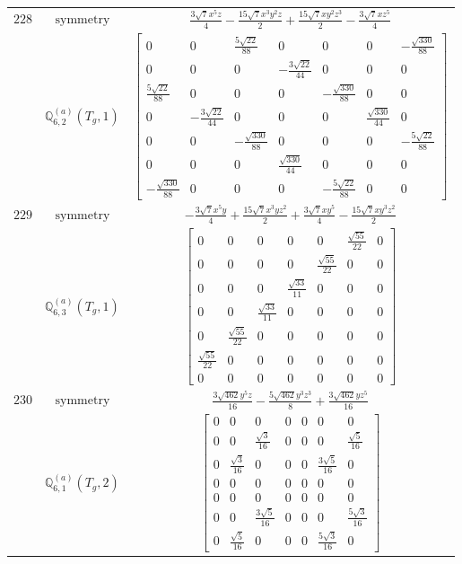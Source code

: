 \documentclass[fleqn,8pt,landscape]{jsarticle}
\begin{document}
\begin{longtable}{ccc}
$ 228 $ & $ \text{symmetry} $ & $ \frac{3 \sqrt{7} x^{5} z}{4} - \frac{15 \sqrt{7} x^{3} y^{2} z}{2} + \frac{15 \sqrt{7} x y^{2} z^{3}}{2} - \frac{3 \sqrt{7} x z^{5}}{4} $ \\
$  $ & $ \mathbb{Q}_{6,2}^{(a)}(T_{g},1) $ & $ \begin{bmatrix} 0 & 0 & \frac{5 \sqrt{22}}{88} & 0 & 0 & 0 & - \frac{\sqrt{330}}{88} \\ 0 & 0 & 0 & - \frac{3 \sqrt{22}}{44} & 0 & 0 & 0 \\ \frac{5 \sqrt{22}}{88} & 0 & 0 & 0 & - \frac{\sqrt{330}}{88} & 0 & 0 \\ 0 & - \frac{3 \sqrt{22}}{44} & 0 & 0 & 0 & \frac{\sqrt{330}}{44} & 0 \\ 0 & 0 & - \frac{\sqrt{330}}{88} & 0 & 0 & 0 & - \frac{5 \sqrt{22}}{88} \\ 0 & 0 & 0 & \frac{\sqrt{330}}{44} & 0 & 0 & 0 \\ - \frac{\sqrt{330}}{88} & 0 & 0 & 0 & - \frac{5 \sqrt{22}}{88} & 0 & 0 \end{bmatrix} $ \\ \hline
$ 229 $ & $ \text{symmetry} $ & $ - \frac{3 \sqrt{7} x^{5} y}{4} + \frac{15 \sqrt{7} x^{3} y z^{2}}{2} + \frac{3 \sqrt{7} x y^{5}}{4} - \frac{15 \sqrt{7} x y^{3} z^{2}}{2} $ \\
$  $ & $ \mathbb{Q}_{6,3}^{(a)}(T_{g},1) $ & $ \begin{bmatrix} 0 & 0 & 0 & 0 & 0 & \frac{\sqrt{55}}{22} & 0 \\ 0 & 0 & 0 & 0 & \frac{\sqrt{55}}{22} & 0 & 0 \\ 0 & 0 & 0 & \frac{\sqrt{33}}{11} & 0 & 0 & 0 \\ 0 & 0 & \frac{\sqrt{33}}{11} & 0 & 0 & 0 & 0 \\ 0 & \frac{\sqrt{55}}{22} & 0 & 0 & 0 & 0 & 0 \\ \frac{\sqrt{55}}{22} & 0 & 0 & 0 & 0 & 0 & 0 \\ 0 & 0 & 0 & 0 & 0 & 0 & 0 \end{bmatrix} $ \\ \hline
$ 230 $ & $ \text{symmetry} $ & $ \frac{3 \sqrt{462} y^{5} z}{16} - \frac{5 \sqrt{462} y^{3} z^{3}}{8} + \frac{3 \sqrt{462} y z^{5}}{16} $ \\
$  $ & $ \mathbb{Q}_{6,1}^{(a)}(T_{g},2) $ & $ \begin{bmatrix} 0 & 0 & 0 & 0 & 0 & 0 & 0 \\ 0 & 0 & \frac{\sqrt{3}}{16} & 0 & 0 & 0 & \frac{\sqrt{5}}{16} \\ 0 & \frac{\sqrt{3}}{16} & 0 & 0 & 0 & \frac{3 \sqrt{5}}{16} & 0 \\ 0 & 0 & 0 & 0 & 0 & 0 & 0 \\ 0 & 0 & 0 & 0 & 0 & 0 & 0 \\ 0 & 0 & \frac{3 \sqrt{5}}{16} & 0 & 0 & 0 & \frac{5 \sqrt{3}}{16} \\ 0 & \frac{\sqrt{5}}{16} & 0 & 0 & 0 & \frac{5 \sqrt{3}}{16} & 0 \end{bmatrix} $ \\ \hline

\end{longtable}
\end{document}
